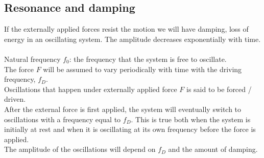 \subsection{Resonance and damping}
If the externally applied forces resist the motion we will have damping, loss of energy in an oscillating system.
The amplitude decreases exponentially with time.\\\\
Natural frequency $f_0$: the frequency that the system is free to oscillate.\\
The force $F$ will be assumed to vary periodically with time with the driving frequency, $f_D$.\\
Oscillations that happen under externally applied force $F$ is said to be forced / driven.\\
After the external force is first applied, the system will eventually switch to oscillations with a
frequency equal to $f_D$. This is true both when the system is initially at rest and when it is
oscillating at its own frequency before the force is applied.\\
The amplitude of the oscillations will depend on $f_D$ and the amount of damping. 

